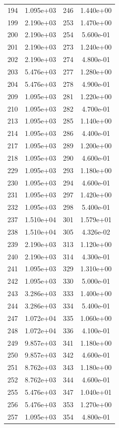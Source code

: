 \documentclass[12pt]{article}
\begin{document}
\begin{longtable}{@{}cccc@{}}
194 & 1.095e+03 & 246 & 1.440e+00 \\
199 & 2.190e+03 & 253 & 1.470e+00 \\
200 & 2.190e+03 & 254 & 5.600e-01 \\
201 & 2.190e+03 & 273 & 1.240e+00 \\
202 & 2.190e+03 & 274 & 4.800e-01 \\
203 & 5.476e+03 & 277 & 1.280e+00 \\
204 & 5.476e+03 & 278 & 4.900e-01 \\
209 & 1.095e+03 & 281 & 1.220e+00 \\
210 & 1.095e+03 & 282 & 4.700e-01 \\
213 & 1.095e+03 & 285 & 1.140e+00 \\
214 & 1.095e+03 & 286 & 4.400e-01 \\
217 & 1.095e+03 & 289 & 1.200e+00 \\
218 & 1.095e+03 & 290 & 4.600e-01 \\
229 & 1.095e+03 & 293 & 1.180e+00 \\
230 & 1.095e+03 & 294 & 4.600e-01 \\
231 & 1.095e+03 & 297 & 1.420e+00 \\
232 & 1.095e+03 & 298 & 5.400e-01 \\
237 & 1.510e+04 & 301 & 1.579e+01 \\
238 & 1.510e+04 & 305 & 4.326e-02 \\
239 & 2.190e+03 & 313 & 1.120e+00 \\
240 & 2.190e+03 & 314 & 4.300e-01 \\
241 & 1.095e+03 & 329 & 1.310e+00 \\
242 & 1.095e+03 & 330 & 5.000e-01 \\
243 & 3.286e+03 & 333 & 1.400e+00 \\
244 & 3.286e+03 & 334 & 5.400e-01 \\
247 & 1.072e+04 & 335 & 1.060e+00 \\
248 & 1.072e+04 & 336 & 4.100e-01 \\
249 & 9.857e+03 & 341 & 1.180e+00 \\
250 & 9.857e+03 & 342 & 4.600e-01 \\
251 & 8.762e+03 & 343 & 1.180e+00 \\
252 & 8.762e+03 & 344 & 4.600e-01 \\
255 & 5.476e+03 & 347 & 1.040e+01 \\
256 & 5.476e+03 & 353 & 1.270e+00 \\
257 & 1.095e+03 & 354 & 4.800e-01 \\

\end{longtable}
\end{document}
